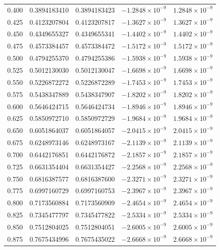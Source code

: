 \documentclass[11pt,a4paper]{article}
\begin{document}
\begin{longtable}{rrrrr}
0.400 & 0.3894183410 & 0.3894183423 & $-1.2848\times 10^{-9}$ & $1.2848\times 10^{-9}$ \\
0.425 & 0.4123207804 & 0.4123207817 & $-1.3627\times 10^{-9}$ & $1.3627\times 10^{-9}$ \\
0.450 & 0.4349655327 & 0.4349655341 & $-1.4402\times 10^{-9}$ & $1.4402\times 10^{-9}$ \\
0.475 & 0.4573384457 & 0.4573384472 & $-1.5172\times 10^{-9}$ & $1.5172\times 10^{-9}$ \\
0.500 & 0.4794255370 & 0.4794255386 & $-1.5938\times 10^{-9}$ & $1.5938\times 10^{-9}$ \\
0.525 & 0.5012130030 & 0.5012130047 & $-1.6698\times 10^{-9}$ & $1.6698\times 10^{-9}$ \\
0.550 & 0.5226872272 & 0.5226872289 & $-1.7453\times 10^{-9}$ & $1.7453\times 10^{-9}$ \\
0.575 & 0.5438347889 & 0.5438347907 & $-1.8202\times 10^{-9}$ & $1.8202\times 10^{-9}$ \\
0.600 & 0.5646424715 & 0.5646424734 & $-1.8946\times 10^{-9}$ & $1.8946\times 10^{-9}$ \\
0.625 & 0.5850972710 & 0.5850972729 & $-1.9684\times 10^{-9}$ & $1.9684\times 10^{-9}$ \\
0.650 & 0.6051864037 & 0.6051864057 & $-2.0415\times 10^{-9}$ & $2.0415\times 10^{-9}$ \\
0.675 & 0.6248973146 & 0.6248973167 & $-2.1139\times 10^{-9}$ & $2.1139\times 10^{-9}$ \\
0.700 & 0.6442176851 & 0.6442176872 & $-2.1857\times 10^{-9}$ & $2.1857\times 10^{-9}$ \\
0.725 & 0.6631354404 & 0.6631354427 & $-2.2568\times 10^{-9}$ & $2.2568\times 10^{-9}$ \\
0.750 & 0.6816387577 & 0.6816387600 & $-2.3271\times 10^{-9}$ & $2.3271\times 10^{-9}$ \\
0.775 & 0.6997160729 & 0.6997160753 & $-2.3967\times 10^{-9}$ & $2.3967\times 10^{-9}$ \\
0.800 & 0.7173560884 & 0.7173560909 & $-2.4654\times 10^{-9}$ & $2.4654\times 10^{-9}$ \\
0.825 & 0.7345477797 & 0.7345477822 & $-2.5334\times 10^{-9}$ & $2.5334\times 10^{-9}$ \\
0.850 & 0.7512804025 & 0.7512804051 & $-2.6005\times 10^{-9}$ & $2.6005\times 10^{-9}$ \\
0.875 & 0.7675434996 & 0.7675435022 & $-2.6668\times 10^{-9}$ & $2.6668\times 10^{-9}$ \\

\end{longtable}
\end{document}
